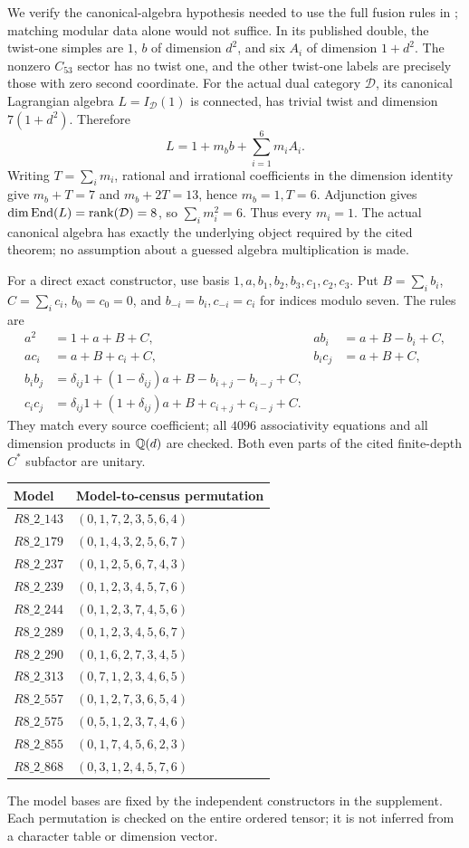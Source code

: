 We verify the canonical-algebra hypothesis needed to use the full
fusion rules in \cite[Theorem~7]{EvansGannon}; matching modular data
alone would not suffice. In its published double, the twist-one
simples are $1$, $b$ of dimension $d^2$, and six $A_i$ of dimension
$1+d^2$. The nonzero $C_{53}$ sector has no twist one, and the other
twist-one labels are precisely those with zero second coordinate.
For the actual dual category $\mathcal D$, its canonical Lagrangian
algebra $L=I_{\mathcal D}(1)$ is connected, has trivial twist and
dimension $7(1+d^2)$. Therefore
\[
L=1+m_b b+\sum_{i=1}^6m_iA_i.
\]
Writing $T=\sum_i m_i$, rational and irrational coefficients in the
dimension identity give $m_b+T=7$ and $m_b+2T=13$, hence
$m_b=1,T=6$. Adjunction gives
$\dim\operatorname{End}(L)=\operatorname{rank}(\mathcal D)=8$, so
$\sum_i m_i^2=6$. Thus every $m_i=1$.
The actual canonical algebra has exactly the underlying object
required by the cited theorem; no assumption about a guessed algebra
multiplication is made.

For a direct exact constructor, use basis
$1,a,b_1,b_2,b_3,c_1,c_2,c_3$. Put $B=\sum_i b_i$, $C=\sum_i c_i$,
$b_0=c_0=0$, and $b_{-i}=b_i,c_{-i}=c_i$ for indices modulo seven.
The rules are
\[
\begin{aligned}
a^2&=1+a+B+C,& ab_i&=a+B-b_i+C,\\
ac_i&=a+B+c_i+C,& b_ic_j&=a+B+C,\\
b_ib_j&=\delta_{ij}1+(1-\delta_{ij})a+B-b_{i+j}-b_{i-j}+C,\\
c_ic_j&=\delta_{ij}1+(1+\delta_{ij})a+B+c_{i+j}+c_{i-j}+C.
\end{aligned}
\]
They match every source coefficient; all $4096$ associativity
equations and all dimension products in $\mathbb Q(d)$ are checked.
Both even parts of the cited finite-depth $C^*$ subfactor are unitary.

\begin{center}\small
\begin{longtable}{@{}lp{}@{}}\toprule
Model & Model-to-census permutation\\\midrule
$R8\_2\_143$ & $(0,1,7,2,3,5,6,4)$\\
$R8\_2\_179$ & $(0,1,4,3,2,5,6,7)$\\
$R8\_2\_237$ & $(0,1,2,5,6,7,4,3)$\\
$R8\_2\_239$ & $(0,1,2,3,4,5,7,6)$\\
$R8\_2\_244$ & $(0,1,2,3,7,4,5,6)$\\
$R8\_2\_289$ & $(0,1,2,3,4,5,6,7)$\\
$R8\_2\_290$ & $(0,1,6,2,7,3,4,5)$\\
$R8\_2\_313$ & $(0,7,1,2,3,4,6,5)$\\
$R8\_2\_557$ & $(0,1,2,7,3,6,5,4)$\\
$R8\_2\_575$ & $(0,5,1,2,3,7,4,6)$\\
$R8\_2\_855$ & $(0,1,7,4,5,6,2,3)$\\
$R8\_2\_868$ & $(0,3,1,2,4,5,7,6)$\\\bottomrule
\end{longtable}
\end{center}
The model bases are fixed by the independent constructors in the
supplement. Each permutation is checked on the entire ordered tensor;
it is not inferred from a character table or dimension vector.
